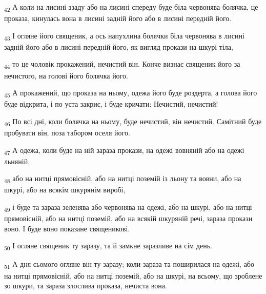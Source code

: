 \begin{tcolorbox}
\textsubscript{42} А коли на лисині ззаду або на лисині спереду буде біла червонява болячка, це проказа, кинулась вона в лисині задній його або в лисині передній його.
\end{tcolorbox}
\begin{tcolorbox}
\textsubscript{43} І огляне його священик, а ось напухлина болячки біла червонява в лисині задній його або в лисині передній його, як вигляд прокази на шкурі тіла,
\end{tcolorbox}
\begin{tcolorbox}
\textsubscript{44} то це чоловік прокажений, нечистий він. Конче визнає священик його за нечистого, на голові його болячка його.
\end{tcolorbox}
\begin{tcolorbox}
\textsubscript{45} А прокажений, що проказа на ньому, одежа його буде роздерта, а голова його буде відкрита, і по уста закриє, і буде кричати: Нечистий, нечистий!
\end{tcolorbox}
\begin{tcolorbox}
\textsubscript{46} По всі дні, коли болячка на ньому, буде нечистий, він нечистий. Самітний буде пробувати він, поза табором оселя його.
\end{tcolorbox}
\begin{tcolorbox}
\textsubscript{47} А одежа, коли буде на ній зараза прокази, на одежі вовняній або на одежі льняній,
\end{tcolorbox}
\begin{tcolorbox}
\textsubscript{48} або на нитці прямовісній, або на нитці поземій із льону та вовни, або на шкурі, або на всякім шкурянім виробі,
\end{tcolorbox}
\begin{tcolorbox}
\textsubscript{49} і буде та зараза зеленява або червонява на одежі, або на шкурі, або на нитці прямовісній, або на нитці поземій, або на всякій шкуряній речі, зараза прокази воно. І буде воно показане священикові.
\end{tcolorbox}
\begin{tcolorbox}
\textsubscript{50} І огляне священик ту заразу, та й замкне заразливе на сім день.
\end{tcolorbox}
\begin{tcolorbox}
\textsubscript{51} А дня сьомого огляне він ту заразу; коли зараза та поширилася на одежі, або на нитці прямовісній, або на нитці поземій, або на шкурі, на всьому, що зроблене зо шкури, та зараза злослива проказа, нечиста вона.
\end{tcolorbox}
